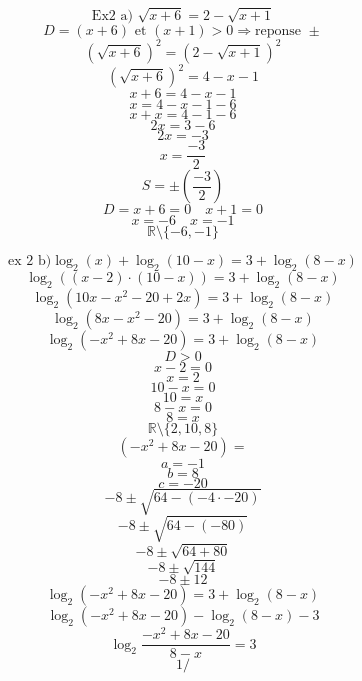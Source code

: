 \documentclass{article}
\begin{document}
\[ \text{Ex2 a) } \sqrt{x+6} = 2 - \sqrt{x+1} \]
\[ D=(x+6) \text{ et } (x+1) > 0\Rightarrow \text{reponse } \pm \]
\[ (\sqrt{x+6})^2 = (2 - \sqrt{x+1})^2 \]
\[ (\sqrt{x+6})^2 = 4 - x - 1 \]
\[ x+6 = 4-x-1 \]
\[ x = 4-x-1-6 \]
\[ x+x = 4-1-6 \]
\[ 2x = 3-6 \]
\[ 2x = -3 \]
\[ x = \frac{-3}{2} \]
\[ S = \pm \left(\frac{-3}{2}\right) \]
\[ D = x+6=0 \quad x+1=0 \]
\[ x=-6 \quad x=-1 \]
\[ \mathbb{R} \setminus \{-6, -1\} \]

\[
\text{ex 2 b)} \log_2 (x) + \log_2 (10-x) = 3 + \log_2 (8-x)
\]
\[
\log_2 ((x-2) \cdot (10-x)) = 3 + \log_2 (8-x)
\]
\[
\log_2 (10x - x^2 - 20 + 2x) = 3 + \log_2 (8-x)
\]
\[
\log_2 (8x - x^2 - 20) = 3 + \log_2 (8-x)
\]
\[
\log_2 (-x^2 + 8x - 20) = 3 + \log_2 (8-x)
\]
\[
D > 0
\]
\[
x-2 = 0
\]
\[
x = 2
\]
\[
10-x = 0
\]
\[
10 = x
\]
\[
8-x = 0
\]
\[
8 = x
\]
\[
\mathbb{R} \setminus \{2, 10, 8\}
\]
\[
(-x^2 + 8x - 20) =
\]
\[
a = -1
\]
\[
b = 8
\]
\[
c = -20
\]
\[
-8 \pm \sqrt{64 - (-4 \cdot-20)}
\]
\[
-8 \pm \sqrt{64 - (-80)}
\]
\[
-8 \pm \sqrt{64 + 80}
\]
\[
-8 \pm \sqrt{144}
\]
\[
-8 \pm 12
\]
\[
\log_2 (-x^2 + 8x - 20) = 3 + \log_2 (8-x)
\]
\[
\log_2 (-x^2 + 8x - 20) - \log_2 (8-x) - 3
\]
\[
\log_2 \frac{-x^2 + 8x - 20}{8-x} = 3 
\]
\[
\text{1/}
\]
\end{document}
